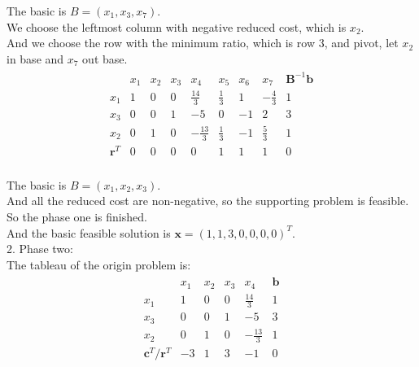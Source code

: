 \documentclass[10pt]{article}
\renewcommand{\mathbf}{\boldsymbol}
\begin{document}
The basic is $B=(x_1,x_3,x_7)$.\\
We choose the leftmost column with negative reduced cost, which is $x_2$.\\
And we choose the row with the minimum ratio, which is row 3, and pivot, let $x_2$ in base and $x_7$ out base.\\

\begin{equation}
	\begin{aligned}
		\begin{array}{c|ccccccc|c}
			& x_1 & x_2 & x_3 & x_4 & x_5 & x_6 & x_7 & \mathbf{B}^{-1}\mathbf{b} \\
			\hline
			x_1 & 1 & 0 & 0 & \frac{14}{3} & \frac{1}{3} & 1 & -\frac{4}{3} & 1 \\
			x_3 & 0 & 0 & 1 & -5 & 0 & -1 & 2 & 3 \\
			x_2 & 0 & 1 & 0 & -\frac{13}{3} & \frac{1}{3} & -1 & \frac{5}{3} & 1 \\
			\hline
			\mathbf{r}^T & 0 & 0 & 0 & 0 & 1 & 1 & 1 & 0 \\
		\end{array}
	\end{aligned}
\end{equation}

The basic is $B=(x_1,x_2,x_3)$.\\
And all the reduced cost are non-negative, so the supporting problem is feasible.\\
So the phase one is finished.\\
And the basic feasible solution is $\mathbf{x}=(1,1,3,0,0,0,0)^T$.\\

2. Phase two:\\
The tableau of the origin problem is:\\
\begin{equation}
	\begin{aligned}
		\begin{array}{c|cccc|c}
			& x_1 & x_2 & x_3 & x_4 & \mathbf{b} \\
			\hline
			x_1 & 1 & 0 & 0 & \frac{14}{3} & 1 \\
			x_3 & 0 & 0 & 1 & -5 & 3 \\
			x_2 & 0 & 1 & 0 & -\frac{13}{3} & 1 \\
			\hline
			\mathbf{c}^T/\mathbf{r}^T & -3 & 1 & 3 & -1 & 0 \\
		\end{array}
	\end{aligned}
\end{equation}
\end{document}
